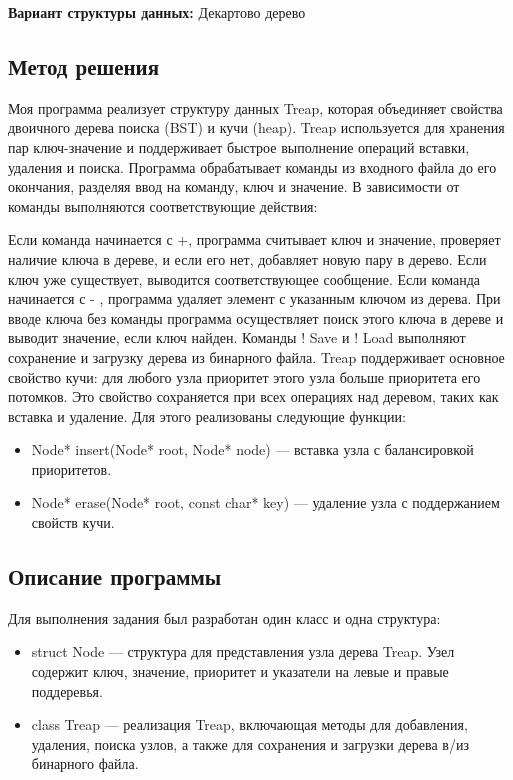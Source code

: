 \documentclass[12pt]{article}
\begin{document}
\textbf{Вариант структуры данных:} Декартово дерево

\subsection*{Метод решения}

Моя программа реализует структуру данных Treap, которая объединяет свойства двоичного дерева поиска (BST) и кучи (heap). Treap используется для хранения пар ключ-значение и поддерживает быстрое выполнение операций вставки, удаления и поиска. Программа обрабатывает команды из входного файла до его окончания, разделяя ввод на команду, ключ и значение. В зависимости от команды выполняются соответствующие действия:

Если команда начинается с +, программа считывает ключ и значение, проверяет наличие ключа в дереве, и если его нет, добавляет новую пару в дерево. Если ключ уже существует, выводится соответствующее сообщение.
Если команда начинается с - , программа удаляет элемент с указанным ключом из дерева.
При вводе ключа без команды программа осуществляет поиск этого ключа в дереве и выводит значение, если ключ найден.
Команды ! Save и ! Load выполняют сохранение и загрузку дерева из бинарного файла.
Treap поддерживает основное свойство кучи: для любого узла приоритет этого узла больше приоритета его потомков. Это свойство сохраняется при всех операциях над деревом, таких как вставка и удаление. Для этого реализованы следующие функции:

\begin{itemize}
\item Node* insert(Node* root, Node* node) — вставка узла с балансировкой приоритетов.
\item Node* erase(Node* root, const char* key) — удаление узла с поддержанием свойств кучи.
\end{itemize}

\subsection*{Описание программы}

Для выполнения задания был разработан один класс и одна структура:

\begin{itemize}
\item struct Node — структура для представления узла дерева Treap. Узел содержит ключ, значение, приоритет и указатели на левые и правые поддеревья.
\item class Treap — реализация Treap, включающая методы для добавления, удаления, поиска узлов, а также для сохранения и загрузки дерева в/из бинарного файла.
\end{itemize}
\end{document}
